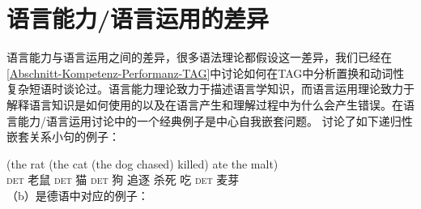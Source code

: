 
\chapter{语言能力/语言运用的差异}
\label{Abschnitt-Diskussion-Performanz}\label{chap-competence-performance}

\begin{sloppypar}
语言能力\nocite{VL2006a}与语言运用之间的差异\citep[\S~1.1]{Chomsky65a}，很多语法理论都假设这一差异，我们已经在\ref{Abschnitt-Kompetenz-Performanz-TAG}中讨论如何在TAG中分析置换和动词性复杂短语时谈论过。语言能力理论致力于描述语言学知识，而语言运用理论致力于解释语言知识是如何使用的以及在语言产生和理解过程中为什么会产生错误。在语言能力/语言运用讨论中的一个经典例子是中心自我嵌套问题。 \citet[]{CM63a}讨论了如下递归性嵌套关系小句的例子：
\end{sloppypar}
\ea
\gll (the rat (the cat (the dog chased) killed) ate the malt)\\
     \textsc{det} 老鼠 \textsc{det} 猫 \textsc{det} 狗 追逐 杀死 吃 \textsc{det} 麦芽\\
\z
（b）是德语中对应的例子：
\eal
